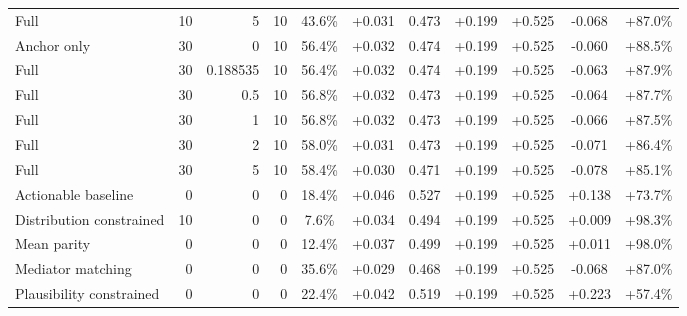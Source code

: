 \begin{table}[htbp]
\begin{tabular}{lrrrccccccc}
Full & 10 & 5 & 10 & 43.6\% & +0.031 & 0.473 & +0.199 & +0.525 & -0.068 & +87.0\% \\
Anchor only & 30 & 0 & 10 & 56.4\% & +0.032 & 0.474 & +0.199 & +0.525 & -0.060 & +88.5\% \\
Full & 30 & 0.188535 & 10 & 56.4\% & +0.032 & 0.474 & +0.199 & +0.525 & -0.063 & +87.9\% \\
Full & 30 & 0.5 & 10 & 56.8\% & +0.032 & 0.473 & +0.199 & +0.525 & -0.064 & +87.7\% \\
Full & 30 & 1 & 10 & 56.8\% & +0.032 & 0.473 & +0.199 & +0.525 & -0.066 & +87.5\% \\
Full & 30 & 2 & 10 & 58.0\% & +0.031 & 0.473 & +0.199 & +0.525 & -0.071 & +86.4\% \\
Full & 30 & 5 & 10 & 58.4\% & +0.030 & 0.471 & +0.199 & +0.525 & -0.078 & +85.1\% \\
Actionable baseline & 0 & 0 & 0 & 18.4\% & +0.046 & 0.527 & +0.199 & +0.525 & +0.138 & +73.7\% \\
Distribution constrained & 10 & 0 & 0 & 7.6\% & +0.034 & 0.494 & +0.199 & +0.525 & +0.009 & +98.3\% \\
Mean parity & 0 & 0 & 0 & 12.4\% & +0.037 & 0.499 & +0.199 & +0.525 & +0.011 & +98.0\% \\
Mediator matching & 0 & 0 & 0 & 35.6\% & +0.029 & 0.468 & +0.199 & +0.525 & -0.068 & +87.0\% \\
Plausibility constrained & 0 & 0 & 0 & 22.4\% & +0.042 & 0.519 & +0.199 & +0.525 & +0.223 & +57.4\% \\
\bottomrule
\end{tabular}
\end{table}